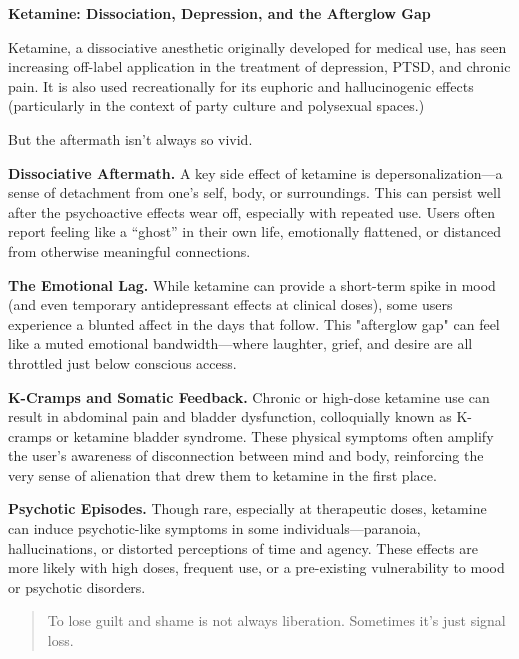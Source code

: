 \begin{TechnicalSidebar}{\textbf{Ketamine: Dissociation, Depression, and the Afterglow Gap}}

  Ketamine, a dissociative anesthetic originally developed for medical use, has seen increasing 
  off-label application in the treatment of depression, PTSD, and chronic pain. It is also used 
  recreationally for its euphoric and hallucinogenic effects (particularly in the context of 
  party culture and polysexual spaces.)

  \medskip
  
  But the aftermath isn’t always so vivid.

  \medskip
  
  \textbf{Dissociative Aftermath.}
  A key side effect of ketamine is depersonalization—a sense of detachment from one’s self, body, 
  or surroundings. This can persist well after the psychoactive effects wear off, especially with 
  repeated use. Users often report feeling like a ``ghost'' in their own life, emotionally flattened, 
  or distanced from otherwise meaningful connections.

  \medskip
  
  \textbf{The Emotional Lag.}
  While ketamine can provide a short-term spike in mood (and even temporary antidepressant effects 
  at clinical doses), some users experience a blunted affect in the days that follow. This "afterglow 
  gap" can feel like a muted emotional bandwidth—where laughter, grief, and desire are all throttled 
  just below conscious access.
  
  \medskip

  \textbf{K-Cramps and Somatic Feedback.}
  Chronic or high-dose ketamine use can result in abdominal pain and bladder dysfunction, colloquially 
  known as K-cramps or ketamine bladder syndrome. These physical symptoms often amplify the user's 
  awareness of disconnection between mind and body, reinforcing the very sense of alienation that 
  drew them to ketamine in the first place.

  \medskip

  \textbf{Psychotic Episodes.}
  Though rare, especially at therapeutic doses, ketamine can induce psychotic-like symptoms in some 
  individuals—paranoia, hallucinations, or distorted perceptions of time and agency. These effects 
  are more likely with high doses, frequent use, or a pre-existing vulnerability to mood or 
  psychotic disorders.
  
  \begin{quote}
  To lose guilt and shame is not always liberation. Sometimes it’s just signal loss.
  \end{quote}

\end{TechnicalSidebar}



